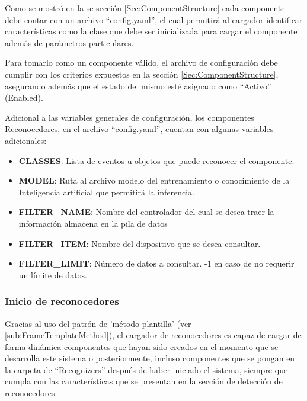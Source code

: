             Como se mostró en la se sección \ref{Sec:ComponentStructure} cada componente debe contar con un archivo ``config.yaml'', el cual permitirá al cargador identificar características como la clase que debe ser inicializada para cargar el componente además de parámetros particulares.
            
            Para tomarlo como un componente válido, el archivo de configuración debe cumplir con los criterios expuestos en la sección \ref{Sec:ComponentStructure}, asegurando además que el estado del mismo esté asignado como ``Activo'' (Enabled). 
            
            Adicional a las variables generales de configuración, los componentes Reconocedores, en el archivo ``config.yaml'', cuentan con algunas variables adicionales: 
            
            \begin{itemize}
                \item \textbf{CLASSES}: Lista de eventos u objetos que puede reconocer el componente.
                \item \textbf{MODEL}: Ruta al archivo modelo del entrenamiento o conocimiento de la Inteligencia artificial  que permitirá la inferencia.
                \item \textbf{FILTER\_NAME}: Nombre del controlador del cual se desea traer la información almacena en la pila de datos
                \item \textbf{FILTER\_ITEM}: Nombre del dispositivo que se desea consultar.
                \item \textbf{FILTER\_LIMIT}: Número de datos a consultar. -1 en caso de no requerir un límite de datos.
            \end{itemize}
            
        \subsubsection{Inicio de reconocedores}
        \label{sub2:HarStarting}
            Gracias al uso del patrón de 'método plantilla' (ver \ref{sub:FrameTemplateMethod}), el cargador de reconocedores es capaz de cargar de forma dinámica componentes que hayan sido creados en el momento que se desarrolla este sistema o posteriormente, incluso componentes que se pongan en la carpeta de ``Recognizers'' después de haber iniciado el sistema, siempre que cumpla con las características que se presentan en la sección de detección de reconocedores.
            
